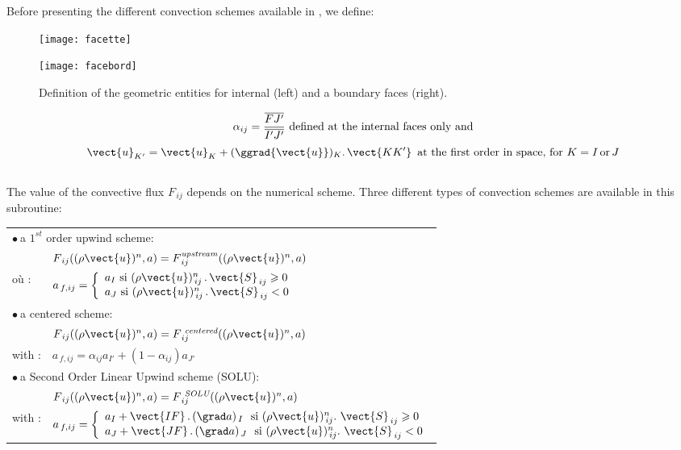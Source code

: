 Before presenting the different convection schemes available in \CS, we define:\\
\begin{figure}[h]
\hspace*{1cm}\parbox{8cm}{%
\centerline{\texttt{[image: facette]}}}
\parbox{8cm}{%
\centerline{\texttt{[image: facebord]}}}
\caption{\label{Base_Bilsc2_fig_geom}Definition of the geometric entities for internal (left) and a boundary faces (right).}
\end{figure}
\begin{equation}\notag
\displaystyle\alpha_{ij}=\frac{\overline{FJ'}}{\overline{I'J'}} \text{\ defined at the internal faces only and}
\end{equation}
\begin{equation}\notag
\vect{u}_{K'} = \vect{u}_{K}+(\ggrad{\vect{u}})_K\text{.}\, \vect{KK'}\, \text{\ at the first order in space, for ${K = I \,\text{or}\, J}$}
\end{equation}\\
The value of the convective flux ${F_{\,ij}}$ depends on the numerical scheme. Three different types of convection schemes are available in this subroutine:


\renewcommand{\arraystretch}{2.}
\begin{tabular}{ll}
\multicolumn{2}{l}{$\bullet\ $a $1^{st}$ order upwind scheme:}\\
&$F_{\,ij}((\rho \vect{u})^n,a)=
F^{\it{ upstream}}_{\,ij}((\rho \vect{u})^n,a)$\\
o\`u :&
$a_{\,f,ij}= \left\lbrace\begin{array}{l}
a_I \text{ si }(\rho \vect{u})_{\,ij}^n\,.\,\vect{S}_{\,ij}\geqslant 0\\
a_J \text{ si }(\rho \vect{u})_{\,ij}^n\,.\,\vect{S}_{\,ij} < 0
\end{array}\right.$\\

\multicolumn{2}{l}{$\bullet\ $a centered scheme:}\\
&$F_{\,ij}((\rho \vect{u})^n,a)=
F^{\text{\it{ centered}}}_{\,ij}((\rho \vect{u})^n,a)$\\
with :&$a_{\,f,ij}= \alpha_{ij} a_{I'}+(1-\alpha_{ij}) a_{J'}$\\
\multicolumn{2}{l}{$\bullet\ $a Second Order Linear Upwind scheme (SOLU):}\\
&$F_{\,ij}((\rho \vect{u})^n,a)=
F^{\text{\it { SOLU}}}_{\,ij}((\rho \vect{u})^n,a)$ \\
with :&
$a_{\,f,ij}=\left\lbrace\begin{array}{l}
a_I +\vect{IF}\,.\,(\grad a)_{\,I}
\text{\ \  si }(\rho \vect{u})_{\,ij}^n.\ \vect{S}_{\,ij}\geqslant 0\\
a_J + \vect{JF}\,.\,(\grad a)_{\,J}
\text{\ \  si }(\rho \vect{u})_{\,ij}^n.\ \vect{S}_{\,ij} < 0
\end{array}\right.$\\
\end{tabular}\\
\renewcommand{\arraystretch}{1.}

